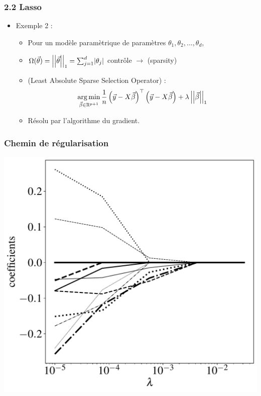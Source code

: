 \begin{frame}
  \frametitle{2.2 Lasso}
  \begin{itemize}
  \item Exemple 2 :  
    \begin{itemize}
    \item Pour un modèle paramètrique de paramètres $\theta_1, \theta_2, \dots, \theta_d$,
    \item[]
      $\Omega(\vec{\theta}) = \left|\left|\vec{\theta}\right|\right|_1 = \sum_{j=1}^d \lvert \theta_j
      \rvert$ contrôle  $\rightarrow$
       \textcolor{gray!70}{(sparsity)} \pause \vspace{1em}
    \item {} (Least Absolute Sparse Selection Operator) :
      \[\operatorname*{arg\,min}_{\vec{\beta} \in {\mathbb R}^{p+1}} \frac1n 
        \left(\vec{y} - X \vec{\beta} \right)^\top \left(\vec{y} - X \vec{\beta}
        \right) + \lambda \left|\left|\vec{\beta}\right|\right|_1 \]
    \item Résolu par l'algorithme du gradient.
    \end{itemize}
  \end{itemize}
\end{frame}

\begin{frame}
  \frametitle{Chemin de régularisation}
  \begin{center}
    \includegraphics[width=.7\textwidth]{figures/lasso_path}  
  \end{center}
\end{frame}

